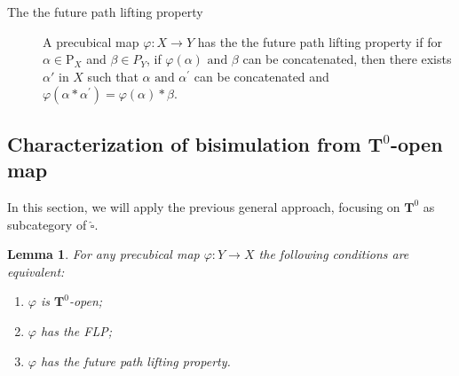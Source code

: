 \documentclass[11pt,a4paper,oldfontcommands]{memoir}
\newcommand{\TrO}{\mathbf{T}}
\newtheorem{lemma}[definition]{Lemma}
\begin{document}
\begin{description}
\item[\hspace{0.5cm} The the future path lifting property]  A precubical map $\varphi: X \to Y$ has the the future path lifting property if for $\alpha \in \mathrm{P}_{X}$ and $\beta \in P_Y$, if $\varphi(\alpha) \text{ and } \beta$ can be concatenated, then there exists $\alpha'$ in $X$ such that $\alpha \text{ and } \alpha^{\prime}$ can be concatenated and $\varphi(\alpha * \alpha^{\prime})=\varphi(\alpha)* \beta$.
\end{description}


\subsection{Characterization of bisimulation from $\TrO^0$-open map}
In this section, we will apply the previous general approach, focusing on $\TrO^0$ as subcategory of $\widehat{\square}$.
\begin{lemma} \label{Lemma: Zig Zag property for U}
For any precubical map $\varphi: Y \rightarrow X$ the following conditions are equivalent:
\begin{enumerate}
    \item $\varphi$ is $\TrO^0$-open;
    \item $\varphi$ has the FLP;
    \item $\varphi$ has the future path lifting property.
    
\end{enumerate}
\end{lemma}
\end{document}
